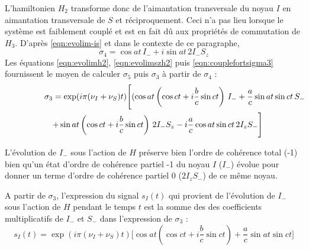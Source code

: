 L'hamiltonien $H_2$ transforme donc de l'aimantation transversale du noyau $I$
en aimantation transversale de $S$ et réciproquement.
Ceci n'a pas lieu lorsque le système est faiblement couplé
et est en fait dû aux propriétés de commutation de $H_3$.
D'après \ref{eqn:evolim-is} et dans le contexte de ce paragraphe,
\begin{equation}
\sigma_4 = \cos at \, I_- + i\sin at \, 2I_-S_z
\end{equation}
Les équations \ref{eqn:evolimh2}, \ref{eqn:evolimszh2} 
puis \ref{eqn:couplefortsigma3} fournissent le moyen
de calculer $\sigma_5$ puis $\sigma_3$ à partir de $\sigma_4$ :
\begin{eqnarray}
\lefteqn{\sigma_3 = \exp(i \pi (\nu_I + \nu_S)t) \Bigg[ (\cos at\left(\cos ct + 
i\frac{b}{c}\sin ct\right) \, I_- +
\frac{a}{c}\sin at \sin ct \, S_-} \nonumber\\
& & + \sin at\left(\cos ct + i\frac{b}{c}\sin ct\right) \, 2 I_-S_z
- i\frac{a}{c}\cos at \sin ct \, 2I_zS_- \Bigg]
\end{eqnarray}

L'évolution de $I_-$ sous l'action de $H$ préserve bien l'ordre de cohérence total (-1)
bien qu'un état d'ordre de cohérence partiel -1 du noyau $I$ ($I_-$) évolue pour donner
un terme d'ordre de cohérence partiel 0 ($2I_zS_-$) de ce même noyau.

A partir de $\sigma_3$, l'expression
du signal $s_I(t)$ qui provient de l'évolution de $I_-$ sous l'action de $H$
pendant le temps $t$ est la somme des des coefficients multiplicatifs
de $I_-$ et $S_-$ dans l'expression de $\sigma_3$ :
\begin{equation}
s_I(t) = \exp(i \pi (\nu_I + \nu_S)t) \Bigg[
\cos at\left(\cos ct + i\frac{b}{c}\sin ct\right) + 
\frac{a}{c}\sin at \sin ct
\Bigg]
\end{equation}

